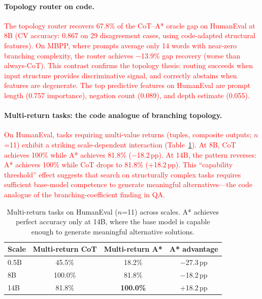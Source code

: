 \documentclass[11pt]{article}
\begin{document}
{{\paragraph{Topology router on code.}
\textcolor{red}{The topology router recovers 67.8\% of the CoT--A* oracle gap on HumanEval at 8B (CV accuracy: 0.867 on 29 disagreement cases, using code-adapted structural features). On MBPP, where prompts average only 14 words with near-zero branching complexity, the router achieves $-$13.9\% gap recovery (worse than always-CoT). This contrast confirms the topology thesis: routing succeeds when input structure provides discriminative signal, and correctly abstains when features are degenerate. The top predictive features on HumanEval are prompt length (0.757 importance), negation count (0.089), and depth estimate (0.055).}

\paragraph{Multi-return tasks: the code analogue of branching topology.}
\textcolor{red}{On HumanEval, tasks requiring multi-value returns (tuples, composite outputs; $n$=11) exhibit a striking scale-dependent interaction (Table~\ref{tab:multi_return}). At 8B, CoT achieves 100\% while A* achieves 81.8\% ($-$18.2\,pp). At 14B, the pattern reverses: A* achieves 100\% while CoT drops to 81.8\% (+18.2\,pp). This ``capability threshold'' effect suggests that search on structurally complex tasks requires sufficient base-model competence to generate meaningful alternatives---the code analogue of the branching-coefficient finding in QA.}

\begin{table}[ht]
\centering
\small
\begin{tabular}{lccc}
\toprule
\textbf{Scale} & \textbf{Multi-return CoT} & \textbf{Multi-return A*} & \textbf{A* advantage} \\
\midrule
0.5B  & 45.5\% & 18.2\% & $-$27.3\,pp \\
8B    & 100.0\% & 81.8\% & $-$18.2\,pp \\
14B   & 81.8\% & \textbf{100.0\%} & +18.2\,pp \\
\bottomrule
\end{tabular}
\caption{Multi-return tasks on HumanEval ($n$=11) across scales. A* achieves perfect accuracy only at 14B, where the base model is capable enough to generate meaningful alternative solutions.}
\label{tab:multi_return}
\end{table}

}}
\end{document}

